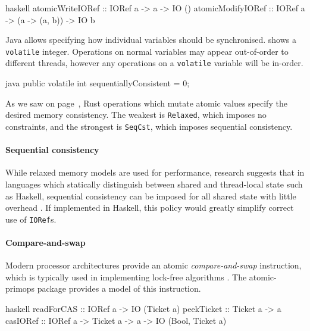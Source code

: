 \begin{listing}
\centering
\begin{cminted}{haskell}
atomicWriteIORef  :: IORef a -> a -> IO ()
atomicModifyIORef :: IORef a -> (a -> (a, b)) -> IO b
\end{cminted}
\caption{Atomic operations in Haskell.}\label{lst:atomic_haskell}
\end{listing}

Java allows specifying how individual variables should be
synchronised.   shows a \verb|volatile| integer.
Operations on normal variables may appear out-of-order to different
threads, however any operations on a \verb|volatile| variable will be
in-order.

\begin{listing}
\centering
\begin{cminted}{java}
public volatile int sequentiallyConsistent = 0;
\end{cminted}
\caption{Atomic operations in Java.}\label{lst:atomic_java}
\end{listing}

As we saw on page~\pageref{page:rust_mem}, Rust operations which
mutate atomic values specify the desired memory consistency.  The
weakest is \verb|Relaxed|, which imposes no constraints, and the
strongest is \verb|SeqCst|, which imposes sequential consistency.

\paragraph{Sequential consistency}
While relaxed memory models are used for performance, research
suggests that in languages which statically distinguish between shared
and thread-local state such as Haskell, sequential consistency can be
imposed for all shared state with little overhead \parencite{vollmer2017}.
If implemented in Haskell, this policy would greatly simplify correct
use of \verb|IORef|s.

\paragraph{Compare-and-swap}
Modern processor architectures provide an atomic
\emph{compare-and-swap} instruction, which is typically used in
implementing lock-free algorithms \parencite{dice2013}.  The
atomic-primops package \parencite{atomic_primops} provides a model of this
instruction.

\begin{listing}
\centering
\begin{cminted}{haskell}
readForCAS :: IORef a -> IO (Ticket a)
peekTicket :: Ticket a -> a
casIORef   :: IORef a -> Ticket a -> a -> IO (Bool, Ticket a)
\end{cminted}
\caption{Compare-and-swap in Haskell.}\label{lst:cas_haskell}
\end{listing}

